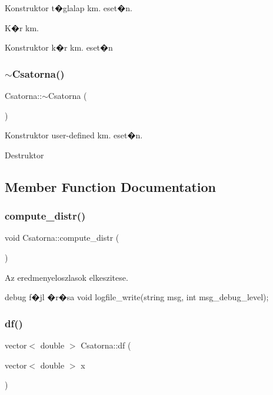 Konstruktor t�glalap km. eset�n. 

K�r km.

Konstruktor k�r km. eset�n \hypertarget{class_csatorna_a84452f3df42df853e0600d383cd37d8a}{}\label{class_csatorna_a84452f3df42df853e0600d383cd37d8a} 
\subsubsection{\texorpdfstring{$\sim$\+Csatorna()}{~Csatorna()}}
{\footnotesize\ttfamily Csatorna\+::$\sim$\+Csatorna (\begin{DoxyParamCaption}{ }\end{DoxyParamCaption})}



Konstruktor user-\/defined km. eset�n. 

Destruktor 

\subsection{Member Function Documentation}
\hypertarget{class_csatorna_a2ad82029529f1aa2b4da3122b608eb6c}{}\label{class_csatorna_a2ad82029529f1aa2b4da3122b608eb6c} 
\subsubsection{\texorpdfstring{compute\+\_\+distr()}{compute\_distr()}}
{\footnotesize\ttfamily void Csatorna\+::compute\+\_\+distr (\begin{DoxyParamCaption}{ }\end{DoxyParamCaption})}



Az eredmenyeloszlasok elkeszitese. 

debug f�jl �r�sa void logfile\+\_\+write(string msg, int msg\+\_\+debug\+\_\+level); \hypertarget{class_csatorna_a5330dbbbc669f49382c822ffcc671d16}{}\label{class_csatorna_a5330dbbbc669f49382c822ffcc671d16} 
\subsubsection{\texorpdfstring{df()}{df()}}
{\footnotesize\ttfamily vector$<$ double $>$ Csatorna\+::df (\begin{DoxyParamCaption}\item[{vector$<$ double $>$}]{x }\end{DoxyParamCaption})\hspace{0.3cm}{\ttfamily [virtual]}}



